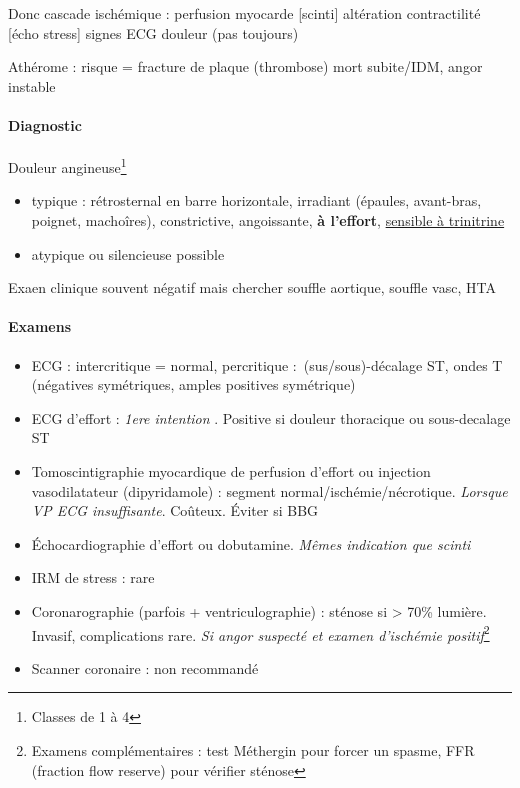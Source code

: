 \documentclass{article}
\begin{document}
Donc cascade ischémique : \dec perfusion myocarde [scinti] \thus altération
contractilité [écho stress] \thus signes ECG \thus douleur (pas toujours)

Athérome : risque = fracture de plaque \thus (thrombose) mort subite/IDM, angor
instable

\paragraph{Diagnostic}
Douleur angineuse\footnote{Classes de 1 à 4}
\begin{itemize}
  \item typique : rétrosternal en barre horizontale, irradiant (épaules,
    avant-bras, poignet, machoîres), constrictive, angoissante, \textbf{à
    l'effort}, \underline{sensible à trinitrine}
  \item atypique ou silencieuse possible
\end{itemize}
Exaen clinique souvent négatif mais chercher souffle aortique, souffle vasc, HTA

\paragraph{Examens}
\begin{itemize}
  \item ECG : intercritique = normal, percritique : (sus/sous)-décalage
    ST, ondes T (négatives symétriques, amples positives symétrique)
  \item ECG d'effort : \textit{1ere intention} . Positive si douleur thoracique ou
    sous-decalage ST
  \item Tomoscintigraphie myocardique de perfusion d'effort ou injection
    vasodilatateur (dipyridamole) : segment normal/ischémie/nécrotique.
    \textit{Lorsque VP ECG insuffisante}. Coûteux. Éviter si \gls{BBG}
  \item Échocardiographie d'effort ou dobutamine. \textit{Mêmes indication que
    scinti} 
  \item IRM de stress : rare
  \item Coronarographie (parfois + ventriculographie) : sténose si > 70\%
    lumière. Invasif, complications rare. \textit{Si angor suspecté et examen
    d'ischémie positif}\footnote{Examens complémentaires : test Méthergin pour
      forcer un spasme, FFR (fraction flow reserve) pour vérifier sténose}
  \item Scanner coronaire : non recommandé
\end{itemize}
\end{document}
